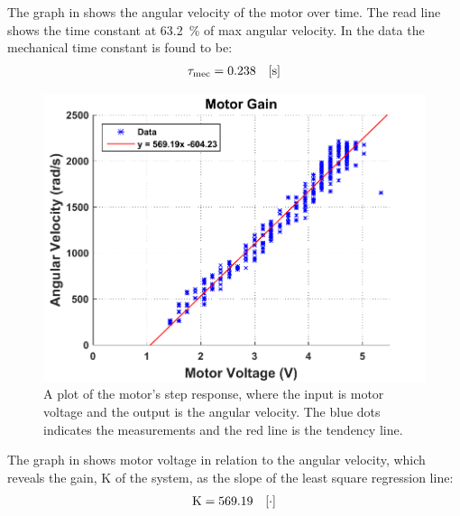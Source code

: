 The graph in  shows the angular velocity of the motor over time. The read line shows the time constant at \si{\num{63.2} \%} of max angular velocity. In the data the mechanical time constant is found to be:
%
\begin{align}
  \eq{\tau_{mec}}{\num{0.238}} \unit{s}\nonumber
\end{align}

\begin{figure}[H]
  \centering
 	\includegraphics[width=.8\textwidth]{figures/motorGain.pdf}
  \caption{A plot of the motor's step response, where the input is motor voltage and the output is the angular velocity. The blue dots indicates the measurements and the red line is the tendency line.}
	\label{motorGain}
\end{figure}

The graph in  shows motor voltage in relation to the angular velocity, which reveals the gain, \si{K} of the system, as the slope of the least square regression line:
%
\begin{align}
  \eq{K}{\num{569.19}} \unit{\cdot}\nonumber
\end{align}
